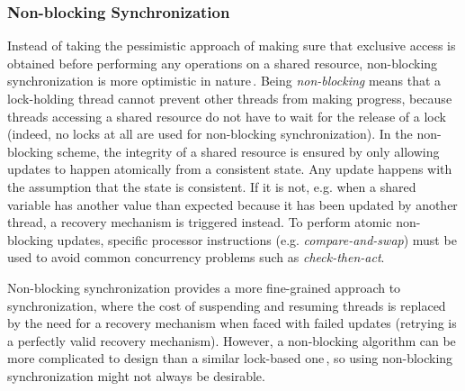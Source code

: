 \subsubsection{Non-blocking Synchronization}
Instead of taking the pessimistic approach of making sure that exclusive access is obtained before performing any operations on a shared resource, non-blocking synchronization is more optimistic in nature\,\citep{Goetz2006}. Being \emph{non-blocking} means that a lock-holding thread cannot prevent other threads from making progress, because threads accessing a shared resource do not have to wait for the release of a lock (indeed, no locks at all are used for non-blocking synchronization). In the non-blocking scheme, the integrity of a shared resource is ensured by only allowing updates to happen atomically from a consistent state. Any update happens with the assumption that the state is consistent. If it is not, e.g. when a shared variable has another value than expected because it has been updated by another thread, a recovery mechanism is triggered instead. To perform atomic non-blocking updates, specific processor instructions (e.g. \emph{compare-and-swap}) must be used to avoid common concurrency problems such as \emph{check-then-act}. 

Non-blocking synchronization provides a more fine-grained approach to synchronization, where the cost of suspending and resuming threads is replaced by the need for a recovery mechanism when faced with failed updates (retrying is a perfectly valid recovery mechanism). However, a non-blocking algorithm can be more complicated to design than a similar lock-based one\,\citep{Goetz2006}, so using non-blocking synchronization might not always be desirable.





